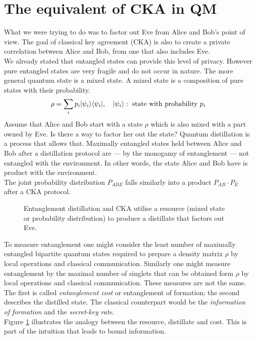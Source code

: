 \section{The equivalent of CKA in QM}
	What we were trying to do was to factor out Eve from Alice and Bob's point of view.
	The goal of classical key agreement (CKA) is also to create a private correlation between Alice and Bob, from one that also includes Eve.\\
	We already stated that entangled states can provide this level of privacy.
	However pure entangled states are very fragile and do not occur in nature.
	The more general quantum state is a mixed state.
	A mixed state is a composition of pure states with their probability.
	\begin{equation}
		\rho = \sum_i p_i |\psi_i \rangle\langle \psi_i| ,\quad |\psi_i \rangle: \text{ state with probability } p_i
	\end{equation}
	Assume that Alice and Bob start with a state $\rho$ which is also mixed with a part owned by Eve. 
	Is there a way to factor her out the state?
	Quantum distillation is a process that allows that. 
	Maximally entangled states held between Alice and Bob after a distillation protocol are --- by the monogamy of entanglement --- not entangled with the environment. 
	In other words, the state Alice and Bob have is product with the environment.\\
	The joint probability distribution $P_{ABE}$ falls similarly into a product $P_{AB}\cdot P_E$ after a CKA protocol.\\
    
    \begin{figure}[h]
    	\centering
    	
    	\caption{Entanglement distillation and CKA utilise a resource (mixed state or probability distribution) to produce a distillate that factors out Eve.}
    	\label{Fig:intuition}
    \end{figure}
    
    To measure entanglement one might consider the least number of maximally entangled bipartite quantum states required to prepare a density matrix $\rho$ by local operations and classical communication. 
    Similarly one might measure entanglement by the maximal number of singlets that can be obtained form $\rho$ by local operations and classical communication. 
    These measures are not the same. 
    The first is called \emph{entanglement cost} or entanglement of formation; the second describes the distilled state. 
    The classical counterpart would be the \emph{information of formation} and the \emph{secret-key rate}.\\
    Figure \ref{Fig:intuition} illustrates the analogy between the resource, distillate and cost.
    This is part of the intuition that leads to bound information.
    
    